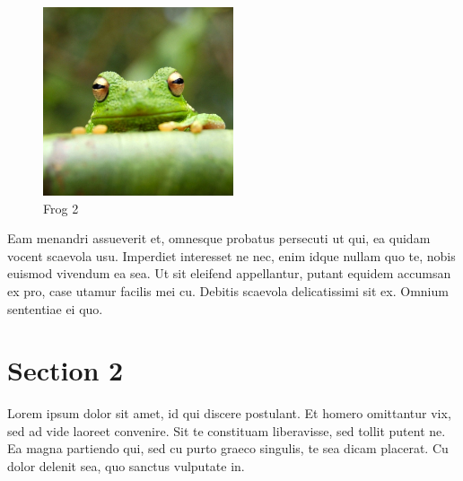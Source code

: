 \begin{figure}[!hbt]
\centering
\includegraphics[width=0.5\textwidth]{frog.jpg}
\caption{\label{fig:frog}Frog 2}
\end{figure}

Eam menandri assueverit et, omnesque probatus persecuti ut qui, ea quidam vocent scaevola usu. Imperdiet interesset ne nec, enim idque nullam quo te, nobis euismod vivendum ea sea. Ut sit eleifend appellantur, putant equidem accumsan ex pro, case utamur facilis mei cu. Debitis scaevola delicatissimi sit ex. Omnium sententiae ei quo.


\section{Section 2}

Lorem ipsum dolor sit amet, id qui discere postulant. Et homero omittantur vix, sed ad vide laoreet convenire. Sit te constituam liberavisse, sed tollit putent ne. Ea magna partiendo qui, sed cu purto graeco singulis, te sea dicam placerat. Cu dolor delenit sea, quo sanctus vulputate in.

